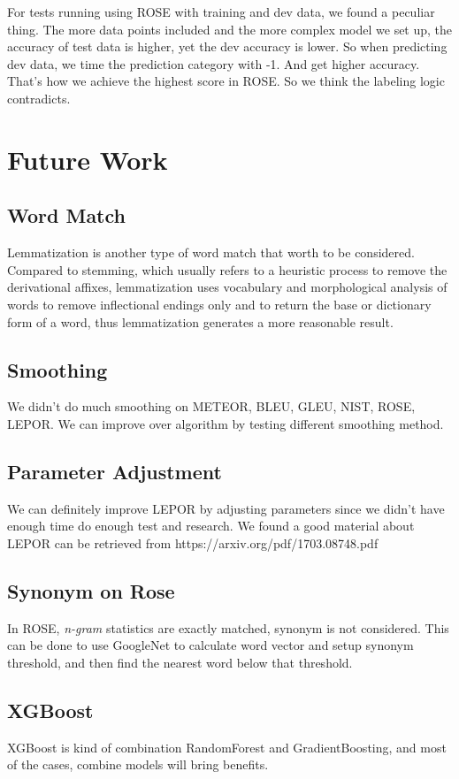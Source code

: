 \documentclass[11pt]{article}
\begin{document}
For tests running using ROSE with training and dev data, we found a peculiar thing. The more data points included and the more complex model we set up, the accuracy of test data is higher, yet the dev accuracy is lower. So when predicting dev data, we time the prediction category with -1. And get higher accuracy. That's how we achieve the highest score in ROSE. So we think the labeling logic contradicts.

\section{Future Work}
\subsection{Word Match}
Lemmatization is another type of word match that worth to be considered. Compared to stemming, which usually refers to a heuristic process to remove the derivational affixes, lemmatization uses vocabulary and morphological analysis of words to remove inflectional endings only and to return the base or dictionary form of a word, thus lemmatization generates a more reasonable result.

\subsection{Smoothing}
We didn't do much smoothing on METEOR, BLEU, GLEU, NIST, ROSE, LEPOR. We can improve over algorithm by testing different smoothing method.

\subsection{Parameter Adjustment}
We can definitely improve LEPOR by adjusting parameters since we didn't have enough time do enough test and research. We found a good material about LEPOR can be retrieved from https://arxiv.org/pdf/1703.08748.pdf

\subsection{Synonym on Rose}
In ROSE, \emph{n-gram} statistics are exactly matched,  synonym is not considered. This can be done to use GoogleNet to calculate word vector and setup synonym threshold, and then find the nearest word below that threshold.
 
\subsection{XGBoost}
XGBoost is kind of combination RandomForest and GradientBoosting, and most of the cases, combine models will bring benefits.
\end{document}
